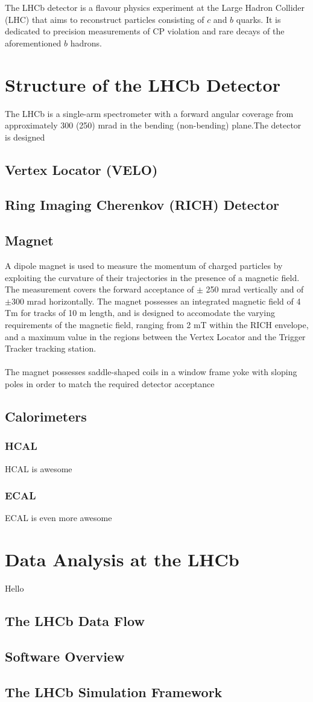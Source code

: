 The LHCb detector is a flavour physics experiment at the Large Hadron Collider (LHC) that aims to reconstruct particles 
consisting of $c$ and $b$ quarks. It is dedicated to precision measurements of CP violation and rare decays of the aforementioned $b$ 
hadrons.  
\section{Structure of the LHCb Detector}
The LHCb is a single-arm spectrometer with a forward angular coverage from approximately 300 (250) mrad in the bending (non-bending) plane.The detector is designed 
\subsection{Vertex Locator (VELO)}
\subsection{Ring Imaging Cherenkov (RICH) Detector}
\subsection{Magnet}
A dipole magnet is used to measure the momentum of charged particles by exploiting the curvature of their trajectories in the presence of a magnetic field. The measurement covers the forward acceptance of $\pm$ 250 mrad vertically and of $\pm$300 mrad horizontally. The magnet possesses an integrated magnetic field of 4 Tm for tracks of 10 m length, and is designed to accomodate the varying requirements of the magnetic field, ranging from 2 mT within the RICH envelope, and a maximum value in the regions between the Vertex Locator and the Trigger Tracker tracking station.\\
\\
The magnet possesses saddle-shaped coils in a window frame yoke with sloping poles in order to match the required detector acceptance
\subsection{Calorimeters}
\subsubsection{HCAL}
HCAL is awesome 
\subsubsection{ECAL}
ECAL is even more awesome
\section{Data Analysis at the LHCb}
Hello
\subsection{The LHCb Data Flow}
\subsection{Software Overview}
\subsection{The LHCb Simulation Framework}




